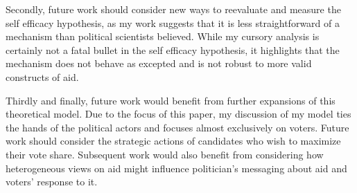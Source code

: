\documentclass[12pt]{paper}
\begin{document}
Secondly, future work should consider new ways to reevaluate and measure the self efficacy hypothesis, as my work suggests that it is less straightforward of a mechanism than political scientists believed. While my cursory analysis is certainly not a fatal bullet in the self efficacy hypothesis, it highlights that the mechanism does not behave as excepted and is not robust to more valid constructs of aid.

Thirdly and finally, future work would benefit from further expansions of this theoretical model. Due to the focus of this paper, my discussion of my model ties the hands of the political actors and focuses almost exclusively on voters. Future work should consider the strategic actions of candidates who wish to maximize their vote share. Subsequent work would also benefit from considering how heterogeneous views on aid might influence politician's messaging about aid and voters' response to it.
%
%

\clearpage
\end{document}
